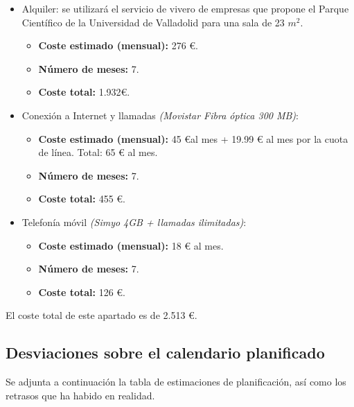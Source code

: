 \documentclass[twoside]{report}
\begin{document}
\begin{itemize}

\item Alquiler: se utilizará el servicio de vivero de empresas que propone el \cite{pcuva} Parque Científico de la Universidad de Valladolid para una sala de 23 ${m}^{2}$.
	\begin{itemize}
		\item \textbf{Coste estimado (mensual): } 276 \euro.
		\item \textbf{Número de meses:} 7.
		\item \textbf{Coste total:} 1.932\euro.
	\end{itemize}
	
\item Conexión a Internet y llamadas \textit{(Movistar Fibra óptica 300 MB)}:
	\begin{itemize}
		\item \textbf{Coste estimado (mensual):} 45 \euro \hspace{0.1cm}al mes + 19.99 \euro \hspace{0.1cm} al mes por la cuota de línea. Total: 65 \euro \hspace{0.1cm} al mes.
		\item \textbf{Número de meses:} 7.
		\item \textbf{Coste total:} 455 \euro.
	\end{itemize}
		
\item Telefonía móvil \textit{(Simyo 4GB + llamadas ilimitadas)}:
	\begin{itemize}
		\item \textbf{Coste estimado (mensual):} 18 \euro \hspace{0.1cm} al mes.
		\item \textbf{Número de meses:} 7.
		\item \textbf{Coste total:} 126 \euro.
	\end{itemize}

\end{itemize}

El coste total de este apartado es de 2.513 \euro.

\subsection{Desviaciones sobre el calendario planificado}

Se adjunta a continuación la tabla de estimaciones de planificación, así como los retrasos que ha habido en realidad.
\end{document}
